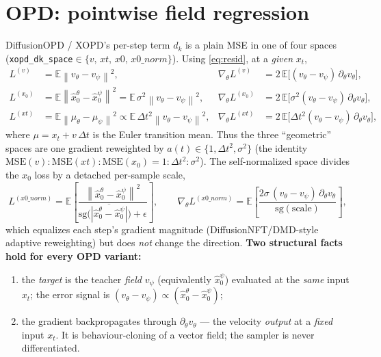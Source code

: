 \documentclass[11pt,a4paper]{article}
\newcommand{\E}{\mathbb{E}}
\newcommand{\norm}[1]{\left\lVert #1 \right\rVert}
\newcommand{\sg}{\mathrm{sg}}
\newcommand{\xh}{\hat{x}_0}
\begin{document}
\section{OPD: pointwise field regression}
DiffusionOPD / XOPD's per-step term $d_k$ is a plain MSE in one of four spaces
(\texttt{xopd\_dk\_space}$\in\{v,\,xt,\,x0,\,x0\_norm\}$). Using \eqref{eq:resid}, at a
\emph{given} $x_t$,
\begin{align}
L^{(v)}   &=\E\norm{v_\theta-v_\psi}^2,
&\nabla_\theta L^{(v)}   &=2\,\E\!\big[(v_\theta-v_\psi)\,\partial_\theta v_\theta\big],\\
L^{(x_0)} &=\E\norm{\xh^\theta-\xh^\psi}^2=\E\,\sigma^2\norm{v_\theta-v_\psi}^2,
&\nabla_\theta L^{(x_0)} &=2\,\E\!\big[\sigma^2(v_\theta-v_\psi)\,\partial_\theta v_\theta\big],\\
L^{(xt)}  &=\E\norm{\mu_\theta-\mu_\psi}^2\propto\E\,\Delta t^2\norm{v_\theta-v_\psi}^2,
&\nabla_\theta L^{(xt)}  &=2\,\E\!\big[\Delta t^2(v_\theta-v_\psi)\,\partial_\theta v_\theta\big],
\end{align}
where $\mu=x_t+v\,\Delta t$ is the Euler transition mean. Thus the three ``geometric'' spaces are
one gradient reweighted by $a(t)\in\{1,\Delta t^2,\sigma^2\}$ (the identity
$\mathrm{MSE}(v):\mathrm{MSE}(xt):\mathrm{MSE}(x_0)=1:\Delta t^2:\sigma^2$). The
self-normalized space divides the $x_0$ loss by a detached per-sample scale,
\begin{equation}
L^{(x0\_norm)}=\E\!\left[\frac{\norm{\xh^\theta-\xh^\psi}^2}
{\sg\big(\overline{|\xh^\theta-\xh^\psi|}\big)+\epsilon}\right],
\qquad
\nabla_\theta L^{(x0\_norm)}=\E\!\left[\frac{2\sigma\,(v_\theta-v_\psi)\,\partial_\theta v_\theta}
{\sg(\text{scale})}\right],
\end{equation}
which equalizes each step's gradient magnitude (DiffusionNFT/DMD-style adaptive reweighting) but
does \emph{not} change the direction. \textbf{Two structural facts hold for every OPD variant:}
\begin{enumerate}[leftmargin=1.6em]
\item the \emph{target} is the teacher \emph{field} $v_\psi$ (equivalently $\xh^\psi$) evaluated at
the \emph{same} input $x_t$; the error signal is $(v_\theta-v_\psi)\propto(\xh^\theta-\xh^\psi)$;
\item the gradient backpropagates through $\partial_\theta v_\theta$ --- the velocity \emph{output}
at a \emph{fixed} input $x_t$. It is behaviour-cloning of a vector field; the sampler is never
differentiated.
\end{enumerate}
\end{document}
